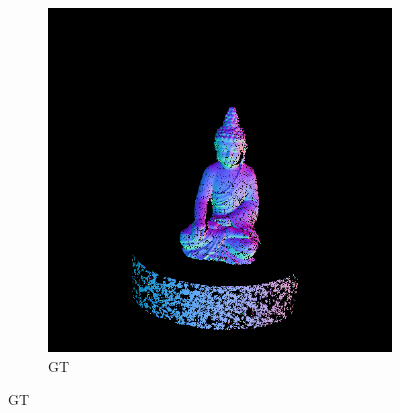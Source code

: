 \begin{figure}[th]
\begin{subfigure}[b]{0.30\linewidth}
		\includegraphics[width=\linewidth]{./Figures/comparison_real/fancy_eval_20_groundtruth.png}
		\caption{GT}
	\end{subfigure}
	

\end{figure}
